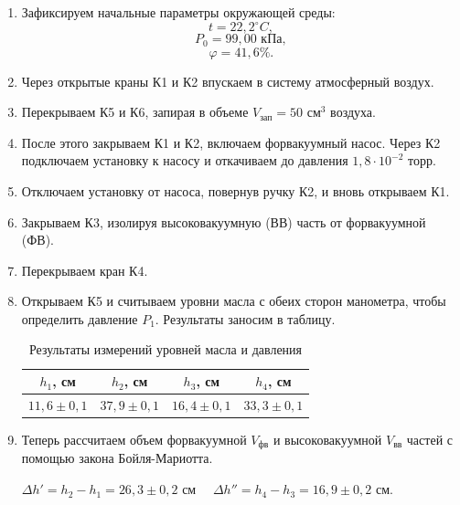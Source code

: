 \documentclass[a4paper,12pt]{article}
\begin{document}
\begin{enumerate}
    \item Зафиксируем начальные параметры окружающей среды:
            \begin{equation*}
            	t = 22,2 ^\circ C,
            \end{equation*}
            \begin{equation*}
            	P_0 = 99,00 \text{ кПа},
            \end{equation*}
            \begin{equation*}
            	\varphi = 41,6 \%.
            \end{equation*}
    \item Через открытые краны К1 и К2 впускаем в систему атмосферный воздух.
    \item Перекрываем К5 и К6, запирая в объеме $V_{\text{зап}} = 50$ см$^3$ воздуха.
    \item После этого закрываем К1 и К2, включаем форвакуумный насос. Через К2 подключаем установку к насосу и откачиваем до давления  $1,8 \cdot 10^{-2}$ торр.
    \item Отключаем установку от насоса, повернув ручку К2, и вновь открываем К1.
    \item Закрываем К3, изолируя высоковакуумную (ВВ) часть от форвакуумной (ФВ).
    \item Перекрываем кран К4.
    \item Открываем К5 и считываем уровни масла с обеих сторон манометра, чтобы определить давление $P_1$. Результаты заносим в таблицу.
    
    \begin{table}[H]
        \centering
        \begin{tabular}{|c|c|c|c|}
            \hline
            $h_1$, см & $h_2$, см  & $h_3$, см & $h_4$, см  \\\hline
            $11,6 \pm 0,1$ & $37,9 \pm 0,1$ &  $16,4 \pm 0,1$ & $33,3 \pm 0,1$  \\\hline
        \end{tabular}
        \caption{Результаты измерений уровней масла и давления}
    \end{table}

   \item
Теперь рассчитаем объем форвакуумной $V_\text{фв}$ и высоковакуумной $V_\text{вв}$ частей с помощью закона Бойля-Мариотта.

     $\Delta h' = h_2 - h_1 = 26,3 \pm 0,2\text{ см}$ \ \ $\Delta h'' = h_4 - h_3 = 16,9 \pm 0,2\text{ см}$.


\end{enumerate}
\end{document}
